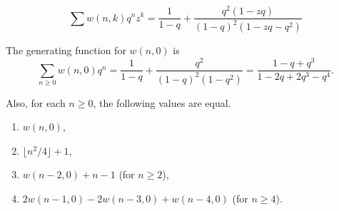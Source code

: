 \documentclass[10pt,a4paper]{amsart}
\begin{document}
\begin{equation}
\sum w(n,k) q^n z^k = \frac{1}{1-q} + \frac{q^2(1-zq)}{(1-q)^2(1-zq-q^2)} \label{wcgf}
\end{equation}

\begin{theorem} \label{wum}
The generating function for $w(n,0)$ is
\begin{equation}
 \sum_{n \ge 0} w(n,0) q^n = \frac{1}{1-q} + \frac{q^2}{(1-q)^2(1-q^2)} = \frac{1-q+q^3}{1 - 2 q + 2 q^3 - q^4}. \label{w0gf}
 \end{equation}

Also, for each $n \ge 0$, the following values are equal.
\begin{enumerate}
\renewcommand{\theenumi}{\alph{enumi}}
\item $w(n,0)$,
\item $\lfloor n^2/4 \rfloor + 1$,
\item $w(n-2,0) + n - 1$ (for $n \ge 2$),
\item $2w(n-1,0) - 2w(n-3,0) + w(n-4,0)$ (for $n \ge 4$).
\end{enumerate}
\end{theorem}
\end{document}
